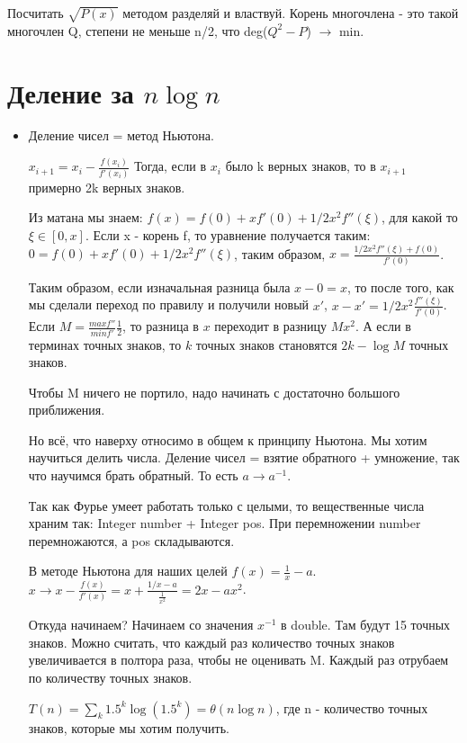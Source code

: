 Посчитать $\sqrt{P(x)}$ методом разделяй и властвуй. Корень многочлена - это такой многочлен Q, степени не меньше n/2, что deg($Q^2 - P$) $\rightarrow$ min.

\section{Деление за $n\log n$}

\begin{itemize}
	\item Деление чисел = метод Ньютона.
	
	$x_{i + 1} = x_i - \frac{f(x_i)}{f'(x_i)}$ Тогда, если в $x_i$ было k верных знаков, то в $x_{i + 1}$ примерно 2k верных знаков.
	
	Из матана мы знаем: $f(x) = f(0) + xf'(0) + 1/2x^2f''(\xi)$, для какой то $\xi \in [0, x]$. Если x - корень f, то уравнение получается таким: $0 = f(0) + xf'(0) + 1/2x^2f''(\xi)$, таким образом, $x = \frac{1/2x^2f''(\xi) + f(0)}{f'(0)}$.
	
	Таким образом, если изначальная разница была $x - 0 = x$, то после того, как мы сделали переход по правилу и получили новый $x'$, $x - x' = 1/2x^2\frac{f''(\xi)}{f'(0)}$. Если $M = \frac{max f''}{min f'}\frac{1}{2}$, то разница в $x$ переходит в разницу $Mx^2$. А если в терминах точных знаков, то $k$ точных знаков становятся $2k - \log M$ точных знаков. 
	
	Чтобы M ничего не портило, надо начинать с достаточно большого приближения.
	
	Но всё, что наверху относимо в общем к принципу Ньютона. Мы хотим научиться делить числа. Деление чисел = взятие обратного + умножение, так что научимся брать обратный. То есть $a \rightarrow a^{-1}$.
	
	Так как Фурье умеет работать только с целыми, то вещественные числа храним так: Integer number + Integer pos. При перемножении number перемножаются, а pos складываются.
	
	В методе Ньютона для наших целей $f(x) = \frac{1}{x} - a$. $x \rightarrow x - \frac{f(x)}{f'(x)} = x + \frac{1/x - a}{\frac{1}{x^2}} = 2x - ax^2$.
	
	Откуда начинаем? Начинаем со значения $x^{-1}$ в double. Там будут 15 точных знаков. Можно считать, что каждый раз количество точных знаков увеличивается в полтора раза, чтобы не оценивать M. Каждый раз отрубаем по количеству точных знаков.
	
	$T(n) = \sum\limits_{k} 1.5^k\log(1.5^k) = \theta(n \log n)$, где n - количество точных знаков, которые мы хотим получить.
	

\end{itemize}
